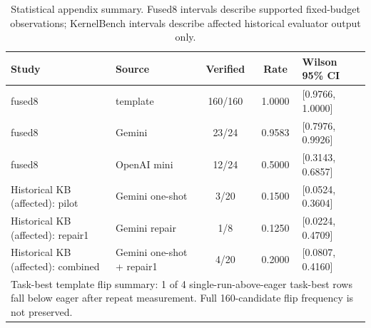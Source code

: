 \begin{table}[htbp]
\centering
\caption{Statistical appendix summary. Fused8 intervals describe supported fixed-budget observations; KernelBench intervals describe affected historical evaluator output only.}
\label{tab:statistical-summary}
\scriptsize
\begin{tabularx}{\linewidth}{l l c c l}
\toprule
Study & Source & Verified & Rate & Wilson 95\% CI \\
\midrule
fused8 & template & 160/160 & 1.0000 & [0.9766, 1.0000] \\
fused8 & Gemini & 23/24 & 0.9583 & [0.7976, 0.9926] \\
fused8 & OpenAI mini & 12/24 & 0.5000 & [0.3143, 0.6857] \\
Historical KB (affected): pilot & Gemini one-shot & 3/20 & 0.1500 & [0.0524, 0.3604] \\
Historical KB (affected): repair1 & Gemini repair & 1/8 & 0.1250 & [0.0224, 0.4709] \\
Historical KB (affected): combined & Gemini one-shot + repair1 & 4/20 & 0.2000 & [0.0807, 0.4160] \\
\midrule
\multicolumn{5}{p{0.92\linewidth}}{Task-best template flip summary: 1 of 4 single-run-above-eager task-best rows fall below eager after repeat measurement. Full 160-candidate flip frequency is not preserved.} \\
\bottomrule
\end{tabularx}
\end{table}
